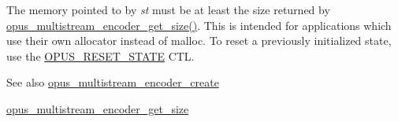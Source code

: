 The memory pointed to by {\itshape st} must be at least the size returned by \hyperlink{group__opus__multistream_ga8642aa9cf16115229a655574d832293b}{opus\+\_\+multistream\+\_\+encoder\+\_\+get\+\_\+size()}. This is intended for applications which use their own allocator instead of malloc. To reset a previously initialized state, use the \hyperlink{group__opus__genericctls_gadc74e4fa8bcdf9994187d52d92207337}{O\+P\+U\+S\+\_\+\+R\+E\+S\+E\+T\+\_\+\+S\+T\+A\+TE} C\+TL. \begin{DoxySeeAlso}{See also}
\hyperlink{group__opus__multistream_gaeb64c648ed8155f824ca8d9a93ccecae}{opus\+\_\+multistream\+\_\+encoder\+\_\+create} 

\hyperlink{group__opus__multistream_ga8642aa9cf16115229a655574d832293b}{opus\+\_\+multistream\+\_\+encoder\+\_\+get\+\_\+size} 
\end{DoxySeeAlso}

